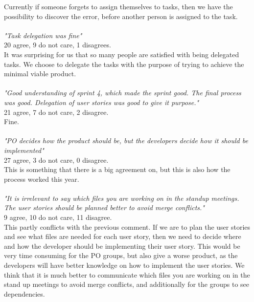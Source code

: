 Currently if someone forgets to assign themselves to tasks, then we have the possibility to discover the error, before another person is assigned to the task.
\\\\
\textit{"Task delegation was fine"}
\\
20 agree, 9 do not care, 1 disagrees.
\\
It was surprising for us that so many people are satisfied with being delegated tasks. 
We choose to delegate the tasks with the purpose of trying to achieve the minimal viable product.
\\\\
\textit{"Good understanding of sprint 4, which made the sprint good. The final process was good. Delegation of user stories was good to give it purpose."}
\\
21 agree, 7 do not care, 2 disagree.
\\
Fine.
\\\\
\textit{"PO decides how the product should be, but the developers decide how it should be implemented"}
\\
27 agree, 3 do not care, 0 disagree.
\\
This is something that there is a big agreement on, but this is also how the process worked this year.
\\\\
\textit{"It is irrelevant to say which files you are working on in the standup meetings. The user stories should be planned better to avoid merge conflicts."}
\\
9 agree, 10 do not care, 11 disagree.
\\
This partly conflicts with the previous comment. 
If we are to plan the user stories and see what files are needed for each user story, then we need to decide where and how the developer should be implementing their user story. 
This would be very time consuming for the PO groups, but also give a worse product, as the developers will have better knowledge on how to implement the user stories.
We think that it is much better to communicate which files you are working on in the stand up meetings to avoid merge conflicts, and additionally for the groups to see dependencies.
